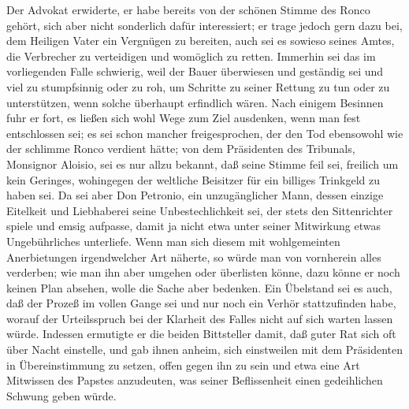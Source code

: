 Der Advokat erwiderte, er habe bereits von der schönen Stimme des
Ronco gehört, sich aber nicht sonderlich dafür interessiert; er
trage jedoch gern dazu bei, dem Heiligen Vater ein Vergnügen zu
bereiten, auch sei es sowieso seines Amtes, die Verbrecher zu
verteidigen und womöglich zu retten. Immerhin sei das im
vorliegenden Falle schwierig, weil der Bauer überwiesen und
geständig sei und viel zu stumpfsinnig oder zu roh, um Schritte zu
seiner Rettung zu tun oder zu unterstützen, wenn solche überhaupt
erfindlich wären. Nach einigem Besinnen fuhr er fort, es ließen
sich wohl Wege zum Ziel ausdenken, wenn man fest entschlossen sei;
es sei schon mancher freigesprochen, der den Tod ebensowohl wie der
schlimme Ronco verdient hätte; von dem Präsidenten des Tribunals,
Monsignor Aloisio, sei es nur allzu bekannt, daß seine Stimme feil
sei, freilich um kein Geringes, wohingegen der weltliche Beisitzer
für ein billiges Trinkgeld zu haben sei. Da sei aber Don
\pagenum{[73]} Petronio, ein unzugänglicher Mann, dessen einzige
Eitelkeit und Liebhaberei seine Unbestechlichkeit sei, der stets
den Sittenrichter spiele und emsig aufpasse, damit ja nicht etwa
unter seiner Mitwirkung etwas Ungebührliches unterliefe. Wenn man
sich diesem mit wohlgemeinten Anerbietungen irgendwelcher Art
näherte, so würde man von vornherein alles verderben; wie man ihn
aber umgehen oder überlisten könne, dazu könne er noch keinen Plan
absehen, wolle die Sache aber bedenken. Ein Übelstand sei es auch,
daß der Prozeß im vollen Gange sei und nur noch ein Verhör
stattzufinden habe, worauf der Urteilsspruch bei der Klarheit des
Falles nicht auf sich warten lassen würde. Indessen ermutigte er
die beiden Bittsteller damit, daß guter Rat sich oft über Nacht
einstelle, und gab ihnen anheim, sich einstweilen mit dem
Präsidenten in Übereinstimmung zu setzen, offen gegen ihn zu sein
und etwa eine Art Mitwissen des Papstes anzudeuten, was seiner
Beflissenheit einen gedeihlichen Schwung geben würde.

